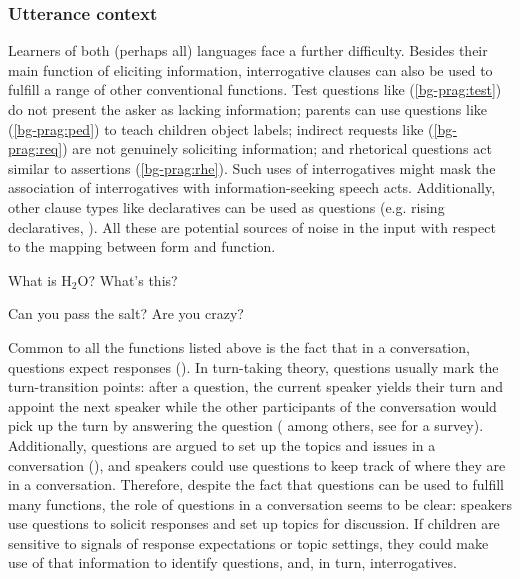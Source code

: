 \subsubsection{Utterance context}

Learners of both (perhaps all) languages face a further difficulty. Besides their main function of eliciting information, interrogative clauses can also be used to fulfill a range of other conventional functions. Test questions like (\ref{bg-prag:test}) do not present the asker as lacking information; parents can use questions like (\ref{bg-prag:ped}) to teach children object labels; indirect requests like (\ref{bg-prag:req}) are not genuinely soliciting information; and rhetorical questions act similar to assertions (\ref{bg-prag:rhe}). Such uses of interrogatives might mask the association of interrogatives with information-seeking speech acts. Additionally, other clause types like declaratives can be used as questions (e.g. rising declaratives, \citealt{gunlogson2004,gunlogson2008,jeong2018,rudin2018}). All these are potential sources of noise in the input with respect to the mapping between form and function.

\bxl\label{bg-prag:test}
What is H$_{2}$O?		\hfill {}
\ex \label{bg-prag:ped}
What's this?	\hfill {}
\exl
\eex

\bex{}
\bxl\label{bg-prag:req}
Can you pass the salt?			\hfill {}
\ex \label{bg-prag:rhe}
Are you crazy?	\hfill {}
\exl
\eex


Common to all the functions listed above is the fact that in a conversation, questions expect responses (\citealt{duncan1972turn}). In turn-taking theory, questions usually mark the turn-transition points: after a question, the current speaker yields their turn and appoint the next speaker while the other participants of the conversation would pick up the turn by answering the question (\citealt{kendon1967gaze, argyle1972gaze, levinson1983, tice2011turn} among others, see \citealt{enfield2010} for a survey).  Additionally, questions are argued to set up the topics and issues in a conversation (\citealt{roberts2012,farkasbruce2010}), and speakers could use questions to keep track of where they are in a conversation. Therefore, despite the fact that questions can be used to fulfill many functions, the role of questions in a conversation seems to be clear: speakers use questions to solicit responses and set up topics for discussion. If children are sensitive to signals of response expectations or topic settings, they could make use of that information to identify questions, and, in turn, interrogatives. 


